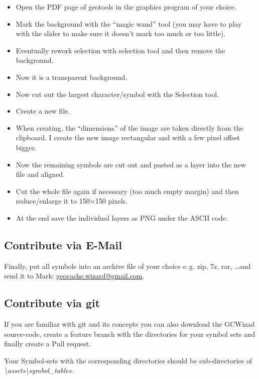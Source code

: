 \begin{description}
        \begin{itemize}
            \item Open the PDF page of geotools in the graphics program of your choice.
            \item Mark the background with the “magic wand” tool (you may have to play with the slider to make sure it doesn’t mark too much or too little).
            \item Eventually rework selection with selection tool and then remove the background.
            \item Now it is a transparent background.
            \item Now cut out the largest character/symbol with the Selection tool.
            \item Create a new file.
            \item When creating, the \enquote{dimensions} of the image are taken directly from the clipboard. I create the new image rectangular and with a few pixel offset bigger.
            \item Now the remaining symbols are cut out and pasted as a layer into the new file and aligned.
            \item Cut the whole file again if necessary (too much empty margin) and then reduce/enlarge it to 150×150 pixels.
            \item At the end save the individual layers as PNG under the ASCII code.
        \end{itemize}
\end{description}

\subsection{Contribute via E-Mail}
Finally, put all symbols into an archive file of your choice e.\,g. zip, 7z, rar, \dots and send it to Mark: \url{geocache.wizard@gmail.com}.

\subsection{Contribute via git}
If you are familiar with git and its concepts you can also download the GCWizad source-code, create a feature branch with the directories for your symbol sets and finally create a Pull request.

Your Symbol-sets with the corresponding directories should be sub-directories of \emph{\textbackslash assets\textbackslash symbol\_tables}.\par

